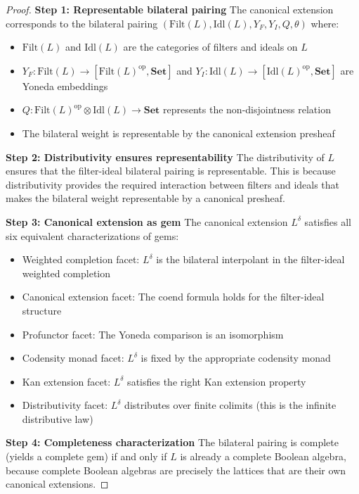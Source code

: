 \documentclass[11pt]{article}
\theoremstyle{plain}
\theoremstyle{definition}
\theoremstyle{remark}
\newcommand{\op}{\mathrm{op}}
\begin{document}
\begin{proof}
\textbf{Step 1: Representable bilateral pairing}
The canonical extension corresponds to the bilateral pairing $(\mathrm{Filt}(L), \mathrm{Idl}(L), Y_F, Y_I, Q, \theta)$ where:
\begin{itemize}
\item $\mathrm{Filt}(L)$ and $\mathrm{Idl}(L)$ are the categories of filters and ideals on $L$
\item $Y_F : \mathrm{Filt}(L) \to [\mathrm{Filt}(L)^{\op}, \mathbf{Set}]$ and $Y_I : \mathrm{Idl}(L) \to [\mathrm{Idl}(L)^{\op}, \mathbf{Set}]$ are Yoneda embeddings
\item $Q : \mathrm{Filt}(L)^{\op} \otimes \mathrm{Idl}(L) \to \mathbf{Set}$ represents the non-disjointness relation
\item The bilateral weight is representable by the canonical extension presheaf
\end{itemize}

\textbf{Step 2: Distributivity ensures representability}
The distributivity of $L$ ensures that the filter-ideal bilateral pairing is representable. This is because distributivity provides the required interaction between filters and ideals that makes the bilateral weight representable by a canonical presheaf.

\textbf{Step 3: Canonical extension as gem}
The canonical extension $L^{\delta}$ satisfies all six equivalent characterizations of gems:
\begin{itemize}
\item Weighted completion facet: $L^{\delta}$ is the bilateral interpolant in the filter-ideal weighted completion
\item Canonical extension facet: The coend formula holds for the filter-ideal structure
\item Profunctor facet: The Yoneda comparison is an isomorphism
\item Codensity monad facet: $L^{\delta}$ is fixed by the appropriate codensity monad
\item Kan extension facet: $L^{\delta}$ satisfies the right Kan extension property
\item Distributivity facet: $L^{\delta}$ distributes over finite colimits (this is the infinite distributive law)
\end{itemize}

\textbf{Step 4: Completeness characterization}
The bilateral pairing is complete (yields a complete gem) if and only if $L$ is already a complete Boolean algebra, because complete Boolean algebras are precisely the lattices that are their own canonical extensions.
\end{proof}
\end{document}
